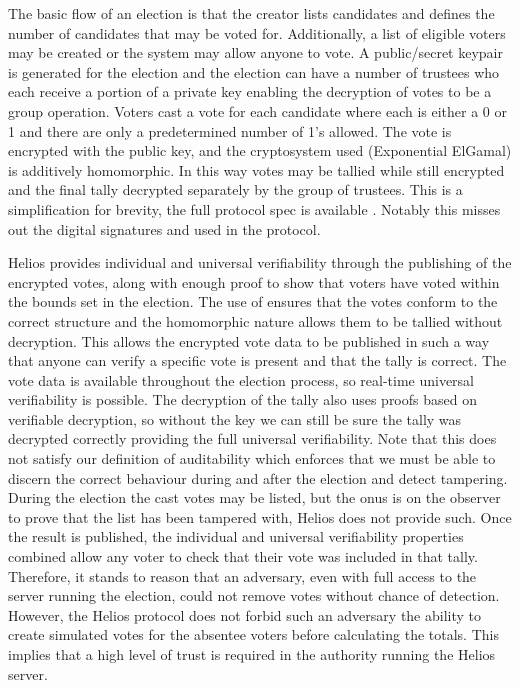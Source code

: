 The basic flow of an election is that the creator lists candidates and defines the number of candidates that may be voted for. Additionally, a list of eligible voters may be created or the system may allow anyone to vote. A public/secret keypair is generated for the election and the election can have a number of trustees who each receive a portion of a private key enabling the decryption of votes to be a group operation. Voters cast a vote for each candidate where each is either a 0 or 1 and there are only a predetermined number of 1's allowed. The vote is encrypted with the public key, and the cryptosystem used (Exponential ElGamal) is additively homomorphic. In this way votes may be tallied while still encrypted and the final tally decrypted separately by the group of trustees. This is a simplification for brevity, the full protocol spec is available \cite{HeliosHeliosV3}. Notably this misses out the digital signatures and  used in the protocol.

Helios provides individual and universal verifiability through the publishing of the encrypted votes, along with enough proof to show that voters have voted within the bounds set in the election. The use of  ensures that the votes conform to the correct structure and the homomorphic nature allows them to be tallied without decryption. This allows the encrypted vote data to be published in such a way that anyone can verify a specific vote is present and that the tally is correct. The vote data is available throughout the election process, so real-time universal verifiability is possible. The decryption of the tally also uses proofs based on verifiable decryption, so without the key we can still be sure the tally was decrypted correctly providing the full universal verifiability. Note that this does not satisfy our definition of auditability which enforces that we must be able to discern the correct behaviour during and after the election and detect tampering. During the election the cast votes may be listed, but the onus is on the observer to prove that the list has been tampered with, Helios does not provide such. Once the result is published, the individual and universal verifiability properties combined allow any voter to check that their vote was included in that tally. Therefore, it stands to reason that an adversary, even with full access to the server running the election, could not remove votes without chance of detection. However, the Helios protocol does not forbid such an adversary the ability to create simulated votes for the absentee voters before calculating the totals. This implies that a high level of trust is required in the authority running the Helios server.

